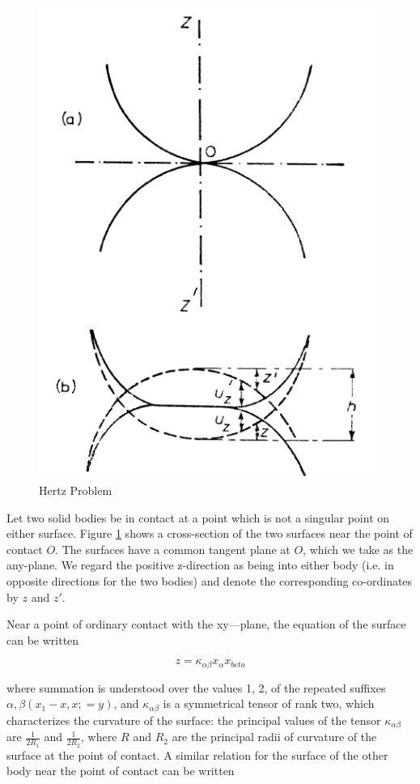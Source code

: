 \begin{figure}[H]
\includegraphics[scale=0.5]{../images/Intro/hertz.png}
\caption{Hertz Problem}
\label{fig:hertzfigure}
\end{figure}

Let two solid bodies be in contact at a point which is not a singular point on either surface. Figure \ref{fig:hertzfigure} shows a cross-section of the two surfaces near the point of contact $O$. The surfaces have a common tangent plane at $O$, which we take as the any-plane. We regard the positive z-direction as being into either body (i.e. in opposite directions for the two bodies) and denote the corresponding co-ordinates by $z$ and $z'$.

Near a point of ordinary contact with the xy—plane, the equation of the surface can be written

\begin{equation}
z = \kappa_{\alpha\beta}x_{\alpha}x_{beta}
\label{eq:contacteq1}
\end{equation}

where summation is understood over the values 1, 2, of the repeated suffixes $\alpha, \beta (x_{1} - x, x; = y)$, and $\kappa_{\alpha\beta}$ is a symmetrical tensor of rank two, which characterizes the curvature of the surface: the principal values of the tensor $\kappa_{\alpha\beta}$ are $\frac{1}{2R_{1}}$ and $\frac{1}{2R_{2}}$, where $R$ and $R_{2}$ are the principal radii of curvature
of the surface at the point of contact. A similar relation for the surface of the other body near the point of contact can be written

